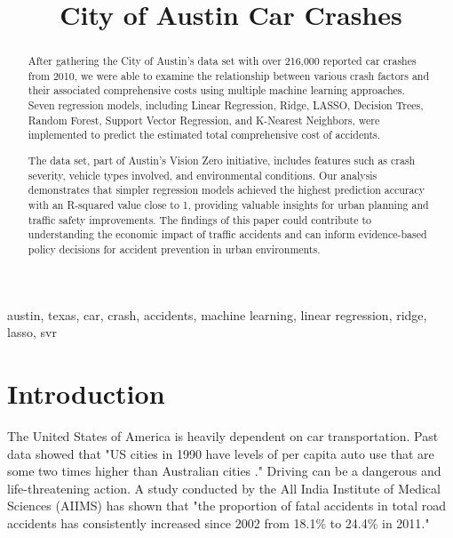 \documentclass[conference]{IEEEtran}
\begin{document}
\title{City of Austin Car Crashes}

\author{
\and
{}
\and
{}
}

\maketitle

\begin{abstract}
After gathering the City of Austin's data set with over 216,000 reported car crashes from 2010, we were able to examine the relationship between various crash factors and their associated comprehensive costs using multiple machine learning approaches. Seven regression models, including Linear Regression, Ridge, LASSO, Decision Trees, Random Forest, Support Vector Regression, and K-Nearest Neighbors, were implemented to predict the estimated total comprehensive cost of accidents. 

The data set, part of Austin's Vision Zero initiative, includes features such as crash severity, vehicle types involved, and environmental conditions. Our analysis demonstrates that simpler regression models achieved the highest prediction accuracy with an R-squared value close to 1, providing valuable insights for urban planning and traffic safety improvements. The findings of this paper could contribute to understanding the economic impact of traffic accidents and can inform evidence-based policy decisions for accident prevention in urban environments.
\end{abstract}

\begin{IEEEkeywords}
austin, texas, car, crash, accidents, machine learning, linear regression, ridge, lasso, svr
\end{IEEEkeywords}

\section{Introduction}
The United States of America is heavily dependent on car transportation. Past data showed that "US cities in 1990 have levels of per capita auto use that are some two times higher than Australian cities \cite{b1}." Driving can be a dangerous and life-threatening action. A study conducted by the All India Institute of Medical Sciences (AIIMS) has shown that "the proportion of fatal accidents in total road accidents has consistently increased since 2002 from 18.1\% to 24.4\% in 2011\cite{b2}."
\end{document}
